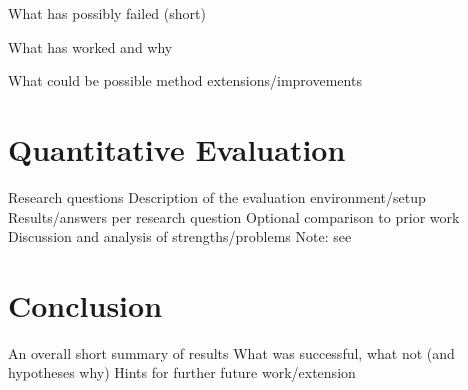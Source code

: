 \documentclass[
     12pt,                    %
     a4paper,             %
     BCOR10mm,     %
     DIV14,                 %
     listof=totoc,                    %
     bibliography=totoc,       %
     index=totoc,              %
     twoside,
     headsepline
     ]{scrreprt}
\begin{document}
What has possibly failed (short)

What has worked and why

What could be possible method extensions/improvements



\chapter{Quantitative Evaluation}
Research questions
Description of the evaluation environment/setup
Results/answers per research question
Optional comparison to prior work
Discussion and analysis of strengths/problems
Note: see 



\chapter{Conclusion}
An overall short summary of results
What was successful, what not (and hypotheses why)
Hints for further future work/extension

\clearpage




\appendix


\end{document}
